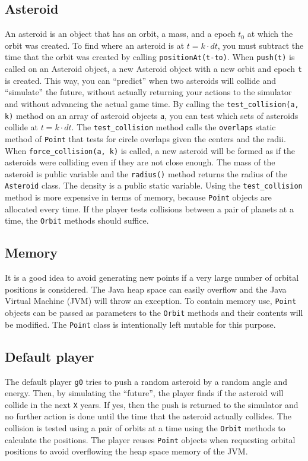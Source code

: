 \begin{appendices}
\subsection{Asteroid}

An asteroid is an object that has an orbit, a mass, and a epoch $t_0$ at which the orbit was created. To find where an asteroid is at $t = k \cdot dt$, you must subtract the time that the orbit was created by calling \verb#positionAt(t-to)#. When \verb#push(t)# is called on an Asteroid object, a new Asteroid object with a new orbit and epoch \verb#t# is created. This way, you can ``predict'' when two asteroids will collide and ``simulate'' the future, without actually returning your actions to the simulator and without advancing the actual game time. By calling the \verb#test_collision(a, k)# method on an array of asteroid objects \verb#a#, you can test which sets of asteroids collide at $t = k \cdot dt$. The \verb#test_collision# method calls the \verb#overlaps# static method of \verb#Point# that tests for circle overlaps given the centers and the radii. When \verb#force_collision(a, k)# is called, a new asteroid will be formed as if the asteroids were colliding even if they are not close enough. The mass of the asteroid is public variable and the \verb#radius()# method returns the radius of the \verb#Asteroid# class. The density is a public static variable. Using the \verb#test_collision# method is more expensive in terms of memory, because \verb#Point# objects are allocated every time. If the player tests collisions between a pair of planets at a time, the \verb#Orbit# methods should suffice.

\subsection{Memory}

It is a good idea to avoid generating new points if a very large number of orbital 
positions is considered. The Java heap space can easily overflow and the Java Virtual Machine (JVM) will throw an exception. To contain memory use, \verb#Point# objects can be passed as parameters to the \verb#Orbit# methods and their contents will be modified. The \verb#Point# class is intentionally left mutable for this purpose.

\subsection{Default player}

The default player \verb#g0# tries to push a random asteroid by a random angle and energy. Then, by simulating the ``future'', the player finds if the asteroid will collide in the next \verb#X# years. If yes, then the push is returned to the simulator and no further action is done until the time that the asteroid actually collides. The collision is tested using a pair of orbits at a time using the \verb#Orbit# methods to calculate the positions. The player reuses \verb#Point# objects when requesting orbital positions to avoid overflowing the heap space memory of the JVM.


\end{appendices}
